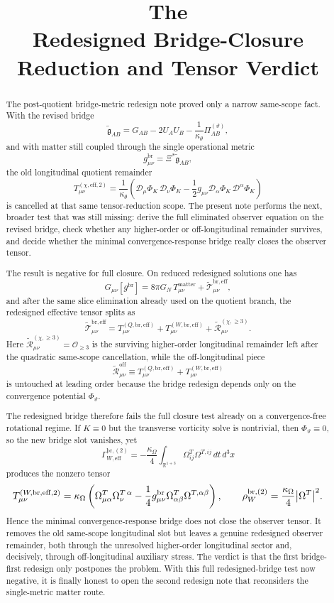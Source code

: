 \documentclass[11pt]{article}
\title{\textbf{The \TheoryName{}}\\[0.4em]
\large Redesigned Bridge-Closure Reduction and Tensor Verdict}
\author{}
\date{}
\newcommand{\ReBridge}{\widetilde{\mathfrak{g}}}
\newcommand{\Dperp}{\mathcal D}
\newcommand{\PiTheta}{\Pi^{(\vartheta)}}
\newcommand{\ReEff}{\widetilde{\mathcal T}_{\mu\nu}^{\mathrm{br,eff}}}
\newcommand{\ReLong}{\widetilde{\mathcal R}_{\mu\nu}^{(\chi,\ge 3)}}
\newcommand{\ReOff}{\widetilde{\mathcal R}_{\mu\nu}^{\mathrm{off}}}
\begin{document}
\maketitle

\begin{abstract}
The post-quotient bridge-metric redesign note proved only a narrow same-scope fact. With the revised bridge
\[
\ReBridge_{AB}
=
G_{AB}-2U_AU_B-\frac{1}{\kappa_\theta}\PiTheta_{AB},
\]
and with matter still coupled through the single operational metric
\[
g^{\mathrm{br}}_{\mu\nu}=\Xi^\ast\ReBridge_{AB},
\]
the old longitudinal quotient remainder
\[
T_{\mu\nu}^{(\chi,\mathrm{eff},2)}
=
\frac{1}{\kappa_\theta}
\left(
\Dperp_\mu\Phi_K\,\Dperp_\nu\Phi_K
-\frac12 g_{\mu\nu}\Dperp_\alpha\Phi_K\,\Dperp^\alpha\Phi_K
\right)
\]
is cancelled at that same tensor-reduction scope. The present note performs the next, broader test that was still missing: derive the full eliminated observer equation on the revised bridge, check whether any higher-order or off-longitudinal remainder survives, and decide whether the minimal convergence-response bridge really closes the observer tensor.

The result is negative for full closure. On reduced redesigned solutions one has
\[
G_{\mu\nu}[g^{\mathrm{br}}]
=
8\pi G_N\,T_{\mu\nu}^{\mathrm{matter}}
+ \ReEff,
\]
and after the same slice elimination already used on the quotient branch, the redesigned effective tensor splits as
\[
\ReEff
=
T_{\mu\nu}^{(Q,\mathrm{br,eff})}
+T_{\mu\nu}^{(W,\mathrm{br,eff})}
+\ReLong.
\]
Here \(\ReLong=\mathcal O_{\ge 3}\) is the surviving higher-order longitudinal remainder left after the quadratic same-scope cancellation, while the off-longitudinal piece
\[
\ReOff
\equiv
T_{\mu\nu}^{(Q,\mathrm{br,eff})}
+T_{\mu\nu}^{(W,\mathrm{br,eff})}
\]
is untouched at leading order because the bridge redesign depends only on the convergence potential \(\Phi_\vartheta\).

The redesigned bridge therefore fails the full closure test already on a convergence-free rotational regime. If \(K\equiv0\) but the transverse vorticity solve is nontrivial, then \(\Phi_\vartheta\equiv0\), so the new bridge slot vanishes, yet
\[
\Gamma_{W,\mathrm{eff}}^{\mathrm{br},(2)}
=
-\frac{\kappa_\Omega}{4}
\int_{\mathbb R^{1+3}}\Omega^T_{ij}\Omega^{T,ij}\,dt\,d^3x
\]
produces the nonzero tensor
\[
T_{\mu\nu}^{(W,\mathrm{br,eff},2)}
=
\kappa_\Omega
\left(
\Omega_{\mu\alpha}^T\Omega_\nu^{T\,\alpha}
-\frac14 g_{\mu\nu}^{\mathrm{br}}\Omega_{\alpha\beta}^T\Omega^{T,\alpha\beta}
\right),
\qquad
\rho_{W}^{\mathrm{br},(2)}
=
\frac{\kappa_\Omega}{4}\abs{\Omega^T}^2.
\]
Hence the minimal convergence-response bridge does not close the observer tensor. It removes the old same-scope longitudinal slot but leaves a genuine redesigned observer remainder, both through the unresolved higher-order longitudinal sector and, decisively, through off-longitudinal auxiliary stress. The verdict is that the first bridge-first redesign only postpones the problem. With this full redesigned-bridge test now negative, it is finally honest to open the second redesign note that reconsiders the single-metric matter route.
\end{abstract}
\end{document}
